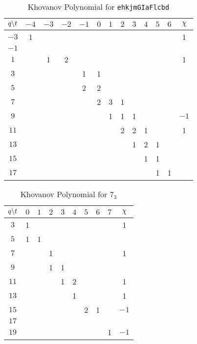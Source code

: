 \begin{table}
    \centering
    \begin{tabular}{| c | c | c | c | c | c | c | c | c | c | c | c | c |}
        \hline
        $q\symbol{92}t$&$-4$&$-3$&$-2$&$-1$&$0$&$1$&$2$&$3$&$4$&$5$&$6$&$\chi$\\
        \hline
        $-3$&1&&&&&&&&&&&1\\
        \hline
        $-1$&&&&&&&&&&&&\\
        \hline
        $1$&&1&2&&&&&&&&&1\\
        \hline
        $3$&&&&1&1&&&&&&&\\
        \hline
        $5$&&&&2&2&&&&&&&\\
        \hline
        $7$&&&&&2&3&1&&&&&\\
        \hline
        $9$&&&&&&1&1&1&&&&$-1$\\
        \hline
        $11$&&&&&&&2&2&1&&&1\\
        \hline
        $13$&&&&&&&&1&2&1&&\\
        \hline
        $15$&&&&&&&&&1&1&&\\
        \hline
        $17$&&&&&&&&&&1&1&\\
        \hline
    \end{tabular}
    \caption{Khovanov Polynomial for \texttt{ehkjmGIaFlcbd}}
\end{table}
\begin{table}
    \centering
    \begin{tabular}{| c | c | c | c | c | c | c | c | c | c |}
        \hline
        $q\symbol{92}t$&$0$&$1$&$2$&$3$&$4$&$5$&$6$&$7$&$\chi$\\
        \hline
        $3$&1&&&&&&&&1\\
        \hline
        $5$&1&1&&&&&&&\\
        \hline
        $7$&&&1&&&&&&1\\
        \hline
        $9$&&&1&1&&&&&\\
        \hline
        $11$&&&&1&2&&&&1\\
        \hline
        $13$&&&&&1&&&&1\\
        \hline
        $15$&&&&&&2&1&&$-1$\\
        \hline
        $17$&&&&&&&&&\\
        \hline
        $19$&&&&&&&&1&$-1$\\
        \hline
    \end{tabular}
    \caption{Khovanov Polynomial for $7_{3}$}
\end{table}
